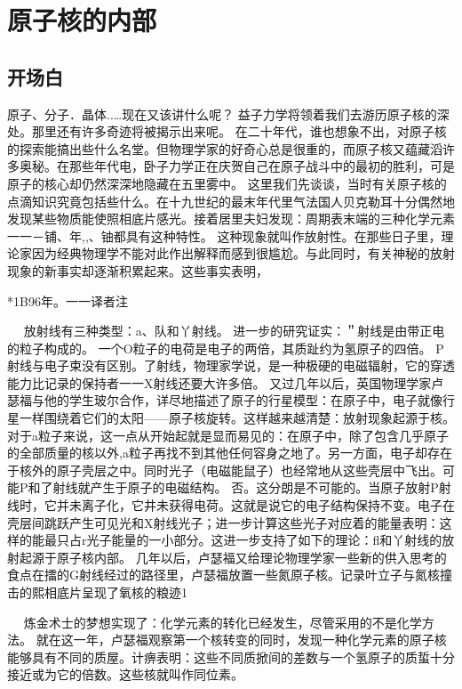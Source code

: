 \chapter{原子核的内部}

\section{开场白}

原子、分子．晶体..…现在又该讲什么呢？
益子力学将领着我们去游历原子核的深处。那里还有许多奇迹将被揭示出来呢。
在二十年代，谁也想象不出，对原子核的探索能搞出些什么名堂。但物理学家的好奇心总是很重的，而原子核又蕴藏滔许多奥秘。在那些年代电，卧子力学正在庆贺自己在原子战斗中的最初的胜利，可是原子的核心却仍然深深地隐藏在五里雾中。
这里我们先谈谈，当时有关原子核的点滴知识究竟包括些什么。在十九世纪的最末年代里气法国人贝克勒耳十分偶然地发现某些物质能使照相底片感光。接着居里夫妇发现：周期表末端的三种化学元素一一－铺、年,,、铀都具有这种特性。
这种现象就叫作放射性。在那些日子里，理论家因为经典物理学不能对此作出解释而感到很尴尬。与此同时，有关神秘的放射现象的新事实却逐渐积累起来。这些事实表明，

*1B96年。一一译者注

  
放射线有三种类型：a、队和丫射线。
进一步的研究证实：＂射线是由带正电的粒子构成的。
一个O粒子的电荷是电子的两倍，其质趾约为氢原子的四倍。
P射线与电子束没有区别。了射线，物理家学说，是一种极硬的电磁辐射，它的穿透能力比记录的保持者一一X射线还要大许多倍。
又过几年以后，英国物理学家卢瑟福与他的学生玻尔合作，详尽地描述了原子的行星模型：在原子中，电子就像行星一样围绕着它们的太阳——原子核旋转。这样越来越清楚：放射现象起源于核。
对于a粒子来说，这一点从开始起就是显而易见的：在原子中，除了包含几乎原子的全部质量的核以外,a粒子再找不到其他任何容身之地了。另一方面，电子却存在于核外的原子壳层之中。同时光子（电磁能鼠子）也经常地从这些壳层中飞出。可能P和了射线就产生于原子的电磁结构。
否。这分朗是不可能的。当原子放射P射线时，它并未离子化，它井未获得电荷。这就是说它的电子结构保持不变。电子在壳层间跳跃产生可见光和X射线光子；进一步计算这些光子对应着的能量表明：这样的能最只占r光子能量的一小部分。这进一步支持了如下的理论：fl和丫射线的放射起源于原子核内部。
几年以后，卢瑟福又给理论物理学家一些新的供入思考的食点在擂的G射线经过的路径里，卢瑟福放置一些氮原子核。记录叶立子与氮核撞击的熙相底片呈现了氧核的粮迹1

  
炼金术士的梦想实现了：化学元素的转化已经发生，尽管采用的不是化学方法。
就在这一年，卢瑟福观察第一个核转变的同时，发现一种化学元素的原子核能够具有不同的质屋。计痹表明：这些不同质掀间的差数与一个氢原子的质蜇十分接近或为它的倍数。这些核就叫作同位素。

